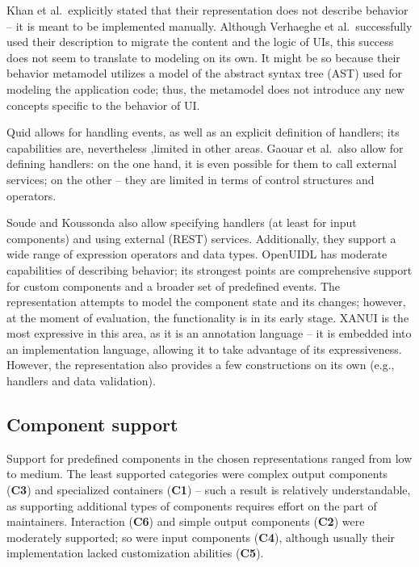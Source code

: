 Khan et al.\ explicitly stated that their representation does not describe behavior -- it is meant to be implemented manually.
Although Verhaeghe et al.\ successfully used their description to migrate the content and the logic of UIs, this success does not seem to translate to modeling on its own.
It might be so because their behavior metamodel utilizes a model of the abstract syntax tree (AST) used for modeling the application code;
thus, the metamodel does not introduce any new concepts specific to the behavior of UI\@.

Quid allows for handling events, as well as an explicit definition of handlers; its capabilities are, nevertheless ,limited in other areas.
Gaouar et al.\ also allow for defining handlers: on the one hand, it is even possible for them to call external services;
on the other -- they are limited in terms of control structures and operators.

Soude and Koussonda also allow specifying handlers (at least for input components) and using external (REST) services.
Additionally, they support a wide range of expression operators and data types.
OpenUIDL has moderate capabilities of describing behavior;
its strongest points are comprehensive support for custom components and a broader set of predefined events.
The representation attempts to model the component state and its changes;
however, at the moment of evaluation, the functionality is in its early stage.
XANUI is the most expressive in this area, as it is an annotation language -- it is embedded into an implementation language, allowing it to take advantage of its expressiveness.
However, the representation also provides a few constructions on its own (e.g., handlers and data validation).

\subsection{Component support}\label{subsec:4-2-component-support}
Support for predefined components in the chosen representations ranged from low to medium.
The least supported categories were complex output components (\textbf{C3}) and specialized containers (\textbf{C1}) -- such a result is relatively understandable, as supporting additional types of components requires effort on the part of maintainers.
Interaction (\textbf{C6}) and simple output components (\textbf{C2}) were moderately supported;
so were input components (\textbf{C4}), although usually their implementation lacked customization abilities (\textbf{C5}).

